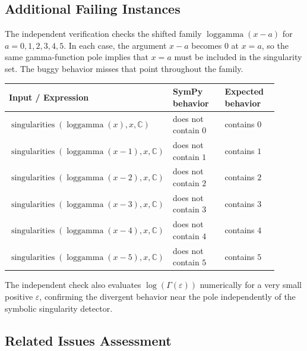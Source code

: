 \documentclass[11pt]{article}
\begin{document}
\subsection{Additional Failing Instances}

The independent verification checks the shifted family
\(\operatorname{loggamma}(x-a)\) for \(a=0,1,2,3,4,5\). In each case, the
argument \(x-a\) becomes \(0\) at \(x=a\), so the same gamma-function pole
implies that \(x=a\) must be included in the singularity set. The buggy behavior
misses that point throughout the family.

\begin{center}
\small
\renewcommand{\arraystretch}{1.3}
\begin{tabular}{@{}>{\raggedright\arraybackslash}p{0.44\linewidth}>{\raggedright\arraybackslash}p{0.23\linewidth}>{\raggedright\arraybackslash}p{0.23\linewidth}@{}}
\toprule
\textbf{Input / Expression} & \textbf{SymPy behavior} & \textbf{Expected behavior} \\
\midrule
\(\operatorname{singularities}(\operatorname{loggamma}(x), x, \mathbb{C})\) &
does not contain \(0\) & contains \(0\) \\
\(\operatorname{singularities}(\operatorname{loggamma}(x-1), x, \mathbb{C})\) &
does not contain \(1\) & contains \(1\) \\
\(\operatorname{singularities}(\operatorname{loggamma}(x-2), x, \mathbb{C})\) &
does not contain \(2\) & contains \(2\) \\
\(\operatorname{singularities}(\operatorname{loggamma}(x-3), x, \mathbb{C})\) &
does not contain \(3\) & contains \(3\) \\
\(\operatorname{singularities}(\operatorname{loggamma}(x-4), x, \mathbb{C})\) &
does not contain \(4\) & contains \(4\) \\
\(\operatorname{singularities}(\operatorname{loggamma}(x-5), x, \mathbb{C})\) &
does not contain \(5\) & contains \(5\) \\
\bottomrule
\end{tabular}
\end{center}

The independent check also evaluates \(\log(\Gamma(\varepsilon))\) numerically
for a very small positive \(\varepsilon\), confirming the divergent behavior
near the pole independently of the symbolic singularity detector.

\subsection{Related Issues Assessment}
\end{document}
